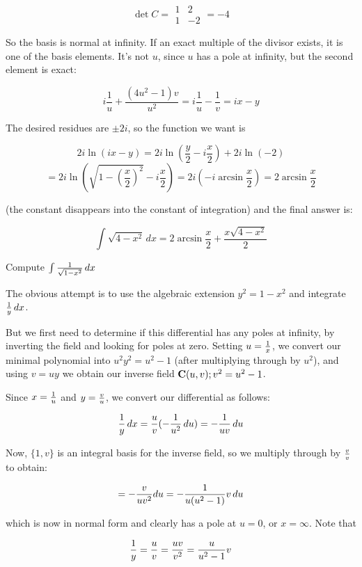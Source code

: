 $$\det C = \begin{array}{|cc|} 1 & 2 \\ 1 & -2 \end{array} = -4$$

So the basis is normal at infinity.  If an exact multiple of
the divisor exists, it is one of the basis elements.  It's not $u$,
since $u$ has a pole at infinity, but the second element is exact:

$$i\frac{1}{u} + \frac{(4u^2-1)v}{u^2} = i\frac{1}{u} - \frac{1}{v} = ix-y$$

The desired residues are $\pm 2i$, so the function we want is

$$2i \ln(ix-y) = 2i \ln(\frac{y}{2}-i\frac{x}{2}) + 2i \ln(-2) $$
$$= 2i \ln\left(\sqrt{1-\left(\frac{x}{2}\right)^2} - i\frac{x}{2}\right) = 2i (-i \arcsin \frac{x}{2}) = 2 \arcsin \frac{x}{2}$$

(the constant disappears into the constant of integration) and the final answer is:

$$ \int \sqrt{4-x^2} \, dx  = 2\arcsin\frac{x}{2} + \frac{x \sqrt{4-x^2}}{2}$$

\endexample


\vfill\eject
{}

\example Compute $\int {1\over{\sqrt{1-x^2}}} \,dx$

The obvious attempt is to use the algebraic extension $y^2=1-x^2$ and
integrate ${1\over y}\,dx$.

But we first need to determine if this differential has any poles at
infinity, by inverting the field and looking for poles at zero.
Setting $u={1\over x}$, we convert our minimal polynomial into
$u^2y^2=u^2-1$ (after multiplying through by $u^2$), and using
$v=uy$ we obtain our inverse field ${\bf C}(u,v); v^2=u^2-1$.

Since $x={1\over u}$ and $y={v\over u}$, we convert our differential as follows:

 $${1\over y}\,dx ={u\over v} (-{1\over{u^2}} \, du) = -{1\over{uv}} \, du$$

Now, $\{1, v\}$ is an integral basis for the inverse field, so we
multiply through by $v\over v$ to obtain:

 $$= -{v\over{uv^2}} du = -{1\over{u(u^2-1)}}v \, du $$

which is now in normal form and clearly has a pole at $u=0$, or $x=\infty$.  Note that

 $${1\over y} = {u\over v} = {{uv}\over{v^2}}
 = {u\over{u^2-1}} v$$

